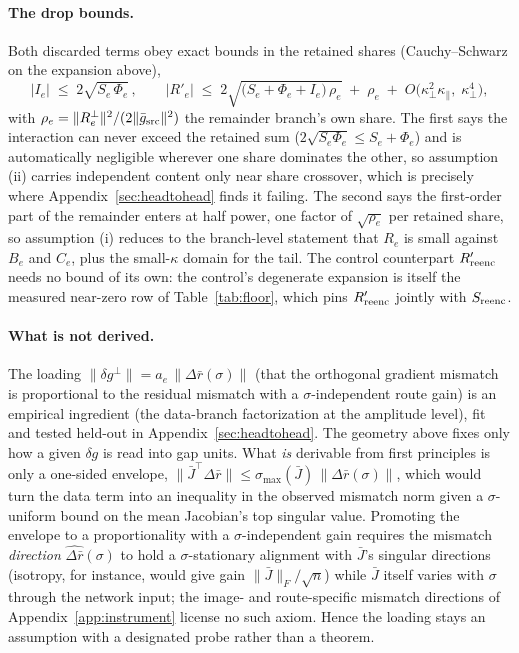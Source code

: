 \paragraph{The drop bounds.} Both discarded terms obey exact bounds in
the retained shares (Cauchy--Schwarz on the expansion above),
\begin{equation}
|I_e| \;\le\; 2\sqrt{S_e\,\Phi_e}\,,
\qquad
\big|R'_e\big| \;\le\; 2\sqrt{\big(S_e + \Phi_e + I_e\big)\,\rho_e}
\;+\; \rho_e
\;+\; O\big(\kappa_\perp^2\kappa_\parallel,\; \kappa_\perp^4\big),
\label{eq:dropbounds}
\end{equation}
with $\rho_e = \|R_e^{\perp}\|^2 / (2\|\bar g_{\mathrm{src}}\|^2)$ the
remainder branch's own share. The first says the interaction can never
exceed the retained sum ($2\sqrt{S_e\Phi_e} \le S_e + \Phi_e$) and is
automatically negligible wherever one share dominates the other, so
assumption (ii) carries independent content only near share
crossover, which is precisely where Appendix~\ref{sec:headtohead} finds
it failing. The second says the first-order part of the remainder
enters at half power, one factor of $\sqrt{\rho_e}$ per retained
share, so assumption (i) reduces to the branch-level statement that
$R_e$ is small against $B_e$ and $C_e$, plus the small-$\kappa$
domain for the tail. The
control counterpart $R'_{\mathrm{reenc}}$ needs no bound of its own: the
control's degenerate expansion is itself the measured near-zero row of
Table~\ref{tab:floor}, which pins $R'_{\mathrm{reenc}}$ jointly with
$S_{\mathrm{reenc}}$.

\paragraph{What is not derived.} The loading
$\|\delta g^{\perp}\| = a_e\, \|\Delta\bar r(\sigma)\|$ (that the orthogonal
gradient mismatch is proportional to the residual mismatch with a
$\sigma$-independent route gain) is an empirical ingredient
(the data-branch factorization at the amplitude level), fit and tested
held-out in Appendix~\ref{sec:headtohead}. The geometry above fixes only how a
given $\delta g$ is read into gap units. What \emph{is} derivable from
first principles is only a one-sided envelope,
$\|\bar J^{\!\top}\Delta\bar r\| \le \sigma_{\max}(\bar J)\,
\|\Delta\bar r(\sigma)\|$, which would turn the data term into an
inequality in the observed mismatch norm given a $\sigma$-uniform bound
on the mean Jacobian's top
singular value. Promoting the envelope to a proportionality with a
$\sigma$-independent gain requires the mismatch \emph{direction}
$\widehat{\Delta\bar r}(\sigma)$ to hold a $\sigma$-stationary
alignment with $\bar J$'s singular directions (isotropy, for instance,
would give gain $\|\bar J\|_F/\sqrt{n}$) while $\bar J$ itself varies
with $\sigma$ through the network input; the image- and
route-specific mismatch directions of Appendix~\ref{app:instrument}
license no such axiom. Hence the loading stays an assumption with a
designated probe rather than a theorem.

